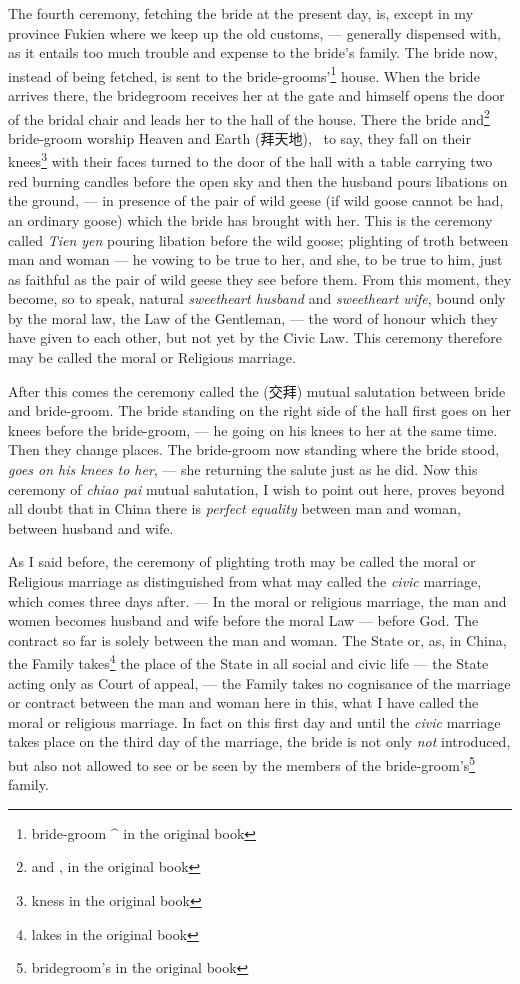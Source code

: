 The fourth ceremony, fetching the bride at the present day, is, except in my province Fukien  where we keep up the old customs, --- generally dispensed with, as it entails too much trouble and expense to the bride's family.
The bride now, instead of being fetched, is sent to the bride-grooms'\footnote{bride-groom  $\^$ in the original book} house.
When the bride arrives there, the bridegroom receives her at the gate and himself opens the door of the bridal chair and leads her to the hall of the house.
There the bride and\footnote{and , in the original book} bride-groom worship Heaven and Earth (拜天地), \ie\, to say, they fall on their knees\footnote{kness in the original book} with their faces turned to the door of the hall with a table carrying two red burning candles before the open sky and then the husband pours libations on the ground, --- in presence of the pair of wild geese (if wild goose cannot be had, an ordinary goose) which the bride has brought with her.
This is the ceremony called \emph{Tien yen} pouring libation before the wild goose; plighting of troth between man and woman --- he vowing to be true to her, and she, to be true to him, just as faithful as the pair of wild geese they see before them.
From this moment, they become, so to speak, natural \emph{sweetheart husband} and \emph{sweetheart wife}, bound only by the moral law, the Law of the Gentleman, --- the word of honour which they have given to each other, but not yet by the Civic Law.
This ceremony therefore may be called the moral or Religious marriage.

After this comes the ceremony called the (交拜) mutual salutation between bride and bride-groom.
The bride standing on the right side of the hall first goes on her knees before the bride-groom, --- he going on his knees to her at the same time.
Then they change places.
The bride-groom now standing where the bride stood, \emph{goes on his knees to her}, --- she returning the salute just as he did.
Now this ceremony of \emph{chiao pai} mutual salutation, I wish to point out here, proves beyond all doubt that in China there is \emph{perfect equality} between man and woman, between husband and wife.

As I said before, the ceremony of plighting troth may be called the moral or Religious marriage as distinguished from what may called the \emph{civic} marriage, which comes three days after.
--- In the moral or religious marriage, the man and women  becomes husband and wife before the moral Law --- before God.
The contract so far is solely between the man and woman.
The State or, as, in China, the Family takes\footnote{lakes in the original book} the place of the State in all social and civic life --- the State acting only as Court of appeal, --- the Family takes no cognisance of the marriage or contract between the man and woman here in this, what I have called the moral or religious marriage.
In fact on this first day and until the \emph{civic} marriage takes place on the third day of the marriage, the bride is not only \emph{not} introduced, but also not allowed to see or be seen by the members of the bride-groom's\footnote{bridegroom's in the original book} family. 

